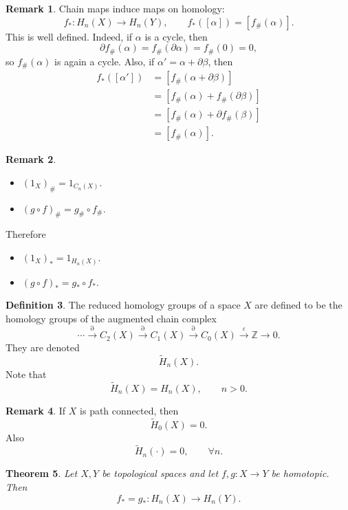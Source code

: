 \documentclass[11pt,a4paper]{article}
\theoremstyle{definition}
\newtheorem{definition}{Definition}[section]
\newtheorem{remark}[definition]{Remark}
\theoremstyle{plain}
\newtheorem{theorem}[definition]{Theorem}
\theoremstyle{remark}
\newcommand{\1}{\mathbbm{1}}
\begin{document}
\begin{remark}
    Chain maps induce maps on homology:
    \[
    f_* \colon H_n(X)\to H_n(Y), \qquad f_*([\alpha])=[f_\#(\alpha)].
    \]
    This is well defined. Indeed, if $\alpha$ is a cycle, then
    \[
    \partial f_\#(\alpha)=f_\#(\partial \alpha)=f_\#(0)=0,
    \]
    so $f_\#(\alpha)$ is again a cycle. Also, if $\alpha'=\alpha+\partial \beta$, then
    \begin{align*}
        f_*([\alpha'])
        &= [f_\#(\alpha+\partial \beta)] \\
        &= [f_\#(\alpha)+f_\#(\partial \beta)] \\
        &= [f_\#(\alpha)+\partial f_\#(\beta)] \\
        &= [f_\#(\alpha)].
    \end{align*}
\end{remark}

\begin{remark}
    \begin{itemize}
        \item $(1_X)_\# = 1_{C_n(X)}$.
        \item $(g\circ f)_\# = g_\#\circ f_\#$.
    \end{itemize}
    Therefore
    \begin{itemize}
        \item $(1_X)_* = 1_{H_n(X)}$.
        \item $(g\circ f)_* = g_*\circ f_*$.
    \end{itemize}
\end{remark}

\begin{definition}
    The reduced homology groups of a space $X$ are defined to be the homology groups of the augmented chain complex
    \[
    \cdots \xrightarrow{\partial} C_2(X) \xrightarrow{\partial} C_1(X) \xrightarrow{\partial} C_0(X) \xrightarrow{\varepsilon} \mathbb{Z}\to 0.
    \]
    They are denoted
    \[
    \widetilde{H}_n(X).
    \]
    Note that
    \[
    \widetilde{H}_n(X)=H_n(X), \qquad n>0.
    \]
\end{definition}

\begin{remark}
    If $X$ is path connected, then
    \[
    \widetilde{H}_0(X)=0.
    \]
    Also
    \[
    \widetilde{H}_n(\cdot)=0, \qquad \forall n.
    \]
\end{remark}

\begin{theorem}
    Let $X,Y$ be topological spaces and let $f,g\colon X\to Y$ be homotopic. Then
    \[
    f_* = g_* \colon H_n(X)\to H_n(Y).
    \]
\end{theorem}
\end{document}
